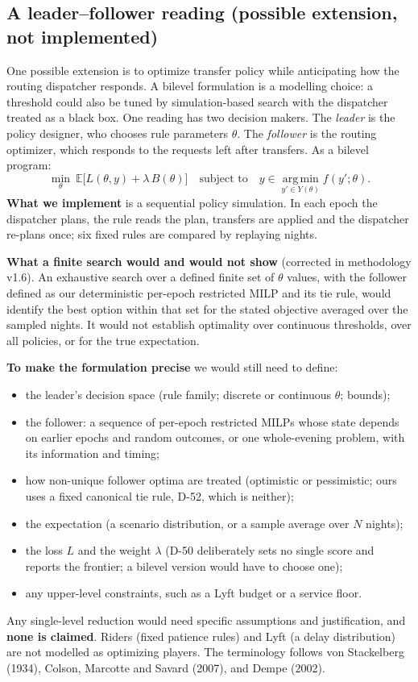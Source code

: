 \documentclass[11pt,letterpaper]{article}
\newcommand{\D}[1]{D-#1}
\begin{document}
\subsection{A leader--follower reading (possible extension, not implemented)}\label{sec:bilevel}
One possible extension is to optimize transfer policy while anticipating how the routing dispatcher responds. A bilevel formulation is a modelling choice: a threshold could also be tuned by simulation-based search with the dispatcher treated as a black box. One reading has two decision makers. The \emph{leader} is the policy designer, who chooses rule parameters $\theta$. The \emph{follower} is the routing optimizer, which responds to the requests left after transfers. As a bilevel program:
\begin{equation}
\min_{\theta}\ \mathbb{E}\bigl[L(\theta, y) + \lambda\, B(\theta)\bigr] \quad\text{subject to}\quad y \in \operatorname*{arg\,min}_{y' \in Y(\theta)} f(y'; \theta).
\end{equation}
\textbf{What we implement} is a sequential policy simulation. In each epoch the dispatcher plans, the rule reads the plan, transfers are applied and the dispatcher re-plans once; six fixed rules are compared by replaying nights.

\textbf{What a finite search would and would not show} (corrected in methodology v1.6). An exhaustive search over a defined finite set of $\theta$ values, with the follower defined as our deterministic per-epoch restricted MILP and its tie rule, would identify the best option within that set for the stated objective averaged over the sampled nights. It would not establish optimality over continuous thresholds, over all policies, or for the true expectation.

\textbf{To make the formulation precise} we would still need to define:
\begin{itemize}
\item the leader's decision space (rule family; discrete or continuous $\theta$; bounds);
\item the follower: a sequence of per-epoch restricted MILPs whose state depends on earlier epochs and random outcomes, or one whole-evening problem, with its information and timing;
\item how non-unique follower optima are treated (optimistic or pessimistic; ours uses a fixed canonical tie rule, \D{52}, which is neither);
\item the expectation (a scenario distribution, or a sample average over $N$ nights);
\item the loss $L$ and the weight $\lambda$ (\D{50} deliberately sets no single score and reports the frontier; a bilevel version would have to choose one);
\item any upper-level constraints, such as a Lyft budget or a service floor.
\end{itemize}
Any single-level reduction would need specific assumptions and justification, and \textbf{none is claimed}. Riders (fixed patience rules) and Lyft (a delay distribution) are not modelled as optimizing players. The terminology follows von Stackelberg (1934), Colson, Marcotte and Savard (2007), and Dempe (2002).
\end{document}
